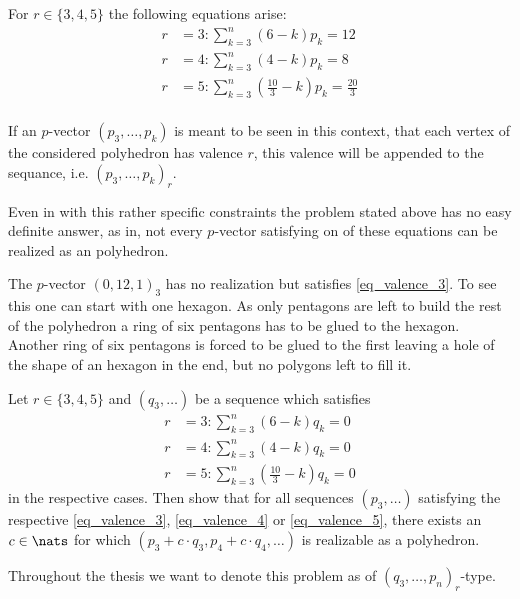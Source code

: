 For $r \in \{3, 4, 5\}$ the following equations arise:
\begin{align}
  r &= 3: \sum_{k=3}^n \left(6 - k \right) p_k = 12 \label{eq_valence_3}\\
  r &= 4: \sum_{k=3}^n \left(4 - k \right) p_k = 8  \label{eq_valence_4}\\
  r &= 5: \sum_{k=3}^n \left( \frac{10}{3} - k \right) p_k = \frac{20}{3} \label{eq_valence_5}\\
\end{align}
\begin{notation}
  If an $p$-vector $(p_3, \dots, p_k)$ is meant to be seen in this context, that each vertex of the considered polyhedron has valence $r$, this valence will be appended to the sequance, i.e. $(p_3, \dots, p_k)_r$.
\end{notation}
Even in with this rather specific constraints the problem stated above has no easy definite answer, as in, not every $p$-vector satisfying on of these equations can be realized as an polyhedron.
\begin{example}
  The $p$-vector $(0, 12, 1)_3$ has no realization but satisfies \autoref{eq_valence_3}. To see this one can start with one hexagon. As only pentagons are left to build the rest of the polyhedron a ring of six pentagons has to be glued to the hexagon. Another ring of six pentagons is forced to be glued to the first leaving a hole of the shape of an hexagon in the end, but no polygons left to fill it.
\end{example}

\begin{problem}
  Let $r \in \{3, 4, 5\}$ and $(q_3, \dots)$ be a sequence which satisfies 
  \begin{align}
    r &= 3: \sum_{k=3}^n \left( 6            - k \right) q_k = 0 \label{eq_zero_curv_3}\\
    r &= 4: \sum_{k=3}^n \left( 4            - k \right) q_k = 0 \label{eq_zero_curv_4}\\
    r &= 5: \sum_{k=3}^n \left( \frac{10}{3} - k \right) q_k = 0 \label{eq_zero_curv_5}
  \end{align}
  in the respective cases. Then show that for all sequences $(p_3, \dots)$  satisfying the respective \autoref{eq_valence_3}, \autoref{eq_valence_4} or \autoref{eq_valence_5}, there exists an $c \in \nats$ for which $(p_3 + c \cdot q_3, p_4 + c \cdot q_4, \dots)$ is realizable as a polyhedron.
\end{problem}
\begin{notation}
  Throughout the thesis we want to denote this problem as of $(q_3, \dots, p_n)_r$-type.
\end{notation}

